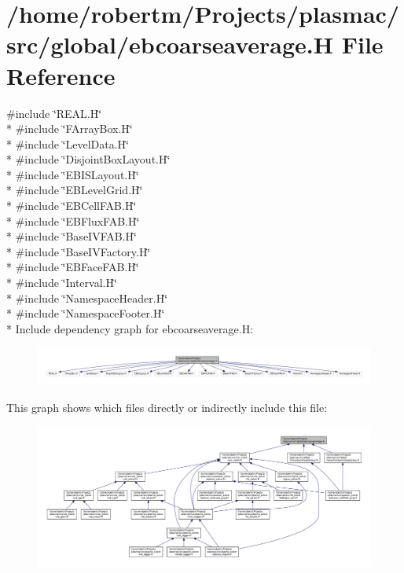 \hypertarget{ebcoarseaverage_8H}{}\section{/home/robertm/\+Projects/plasmac/src/global/ebcoarseaverage.H File Reference}
\label{ebcoarseaverage_8H}
{\ttfamily \#include \char`\"{}R\+E\+A\+L.\+H\char`\"{}}\\*
{\ttfamily \#include \char`\"{}F\+Array\+Box.\+H\char`\"{}}\\*
{\ttfamily \#include \char`\"{}Level\+Data.\+H\char`\"{}}\\*
{\ttfamily \#include \char`\"{}Disjoint\+Box\+Layout.\+H\char`\"{}}\\*
{\ttfamily \#include \char`\"{}E\+B\+I\+S\+Layout.\+H\char`\"{}}\\*
{\ttfamily \#include \char`\"{}E\+B\+Level\+Grid.\+H\char`\"{}}\\*
{\ttfamily \#include \char`\"{}E\+B\+Cell\+F\+A\+B.\+H\char`\"{}}\\*
{\ttfamily \#include \char`\"{}E\+B\+Flux\+F\+A\+B.\+H\char`\"{}}\\*
{\ttfamily \#include \char`\"{}Base\+I\+V\+F\+A\+B.\+H\char`\"{}}\\*
{\ttfamily \#include \char`\"{}Base\+I\+V\+Factory.\+H\char`\"{}}\\*
{\ttfamily \#include \char`\"{}E\+B\+Face\+F\+A\+B.\+H\char`\"{}}\\*
{\ttfamily \#include \char`\"{}Interval.\+H\char`\"{}}\\*
{\ttfamily \#include \char`\"{}Namespace\+Header.\+H\char`\"{}}\\*
{\ttfamily \#include \char`\"{}Namespace\+Footer.\+H\char`\"{}}\\*
Include dependency graph for ebcoarseaverage.\+H\+:\nopagebreak
\begin{figure}[H]
\begin{center}
\leavevmode
\includegraphics[width=350pt]{ebcoarseaverage_8H__incl}
\end{center}
\end{figure}
This graph shows which files directly or indirectly include this file\+:\nopagebreak
\begin{figure}[H]
\begin{center}
\leavevmode
\includegraphics[width=350pt]{ebcoarseaverage_8H__dep__incl}
\end{center}
\end{figure}
